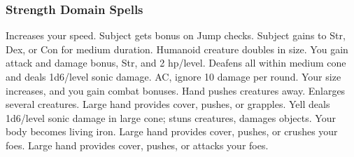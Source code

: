 \subsubsection{Strength Domain Spells}
\begin{spelllist}
   Increases your speed.
   Subject gets bonus on Jump checks.
   Subject gains  to Str, Dex, or Con for medium duration.
  \spellhead[2]{}
   Humanoid creature doubles in size.
   You gain attack and damage bonus,  Str, and 2 hp/level.
   Deafens all within medium cone and deals 1d6/level sonic damage.
    AC, ignore 10 damage per round.
   Your size increases, and you gain combat bonuses.
   Hand pushes creatures away.
   Enlarges several creatures.
   Large hand provides cover, pushes, or grapples.
   Yell deals 1d6/level sonic damage in large cone; stuns creatures, damages objects.
   Your body becomes living iron.
   Large hand provides cover, pushes, or crushes your foes.
   Large hand provides cover, pushes, or attacks your foes.
  \spellhead[9]{} 
\end{spelllist}

